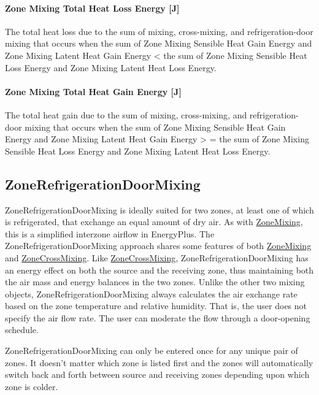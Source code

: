\paragraph{Zone Mixing Total Heat Loss Energy {[}J{]}}\label{zone-mixing-total-heat-loss-energy-j-1}

The total heat loss due to the sum of mixing, cross-mixing, and refrigeration-door mixing that occurs when the sum of Zone Mixing Sensible Heat Gain Energy and Zone Mixing Latent Heat Gain Energy \textless{} the sum of Zone Mixing Sensible Heat Loss Energy and Zone Mixing Latent Heat Loss Energy.

\paragraph{Zone Mixing Total Heat Gain Energy {[}J{]}}\label{zone-mixing-total-heat-gain-energy-j-1}

The total heat gain due to the sum of mixing, cross-mixing, and refrigeration-door mixing that occurs when the sum of Zone Mixing Sensible Heat Gain Energy and Zone Mixing Latent Heat Gain Energy \textgreater{} = the sum of Zone Mixing Sensible Heat Loss Energy and Zone Mixing Latent Heat Loss Energy.

\subsection{ZoneRefrigerationDoorMixing}\label{zonerefrigerationdoormixing}

ZoneRefrigerationDoorMixing is ideally suited for two zones, at least one of which is refrigerated, that exchange an equal amount of dry air. As with \hyperref[zonemixing]{ZoneMixing}, this is a simplified interzone airflow in EnergyPlus. The ZoneRefrigerationDoorMixing approach shares some features of both \hyperref[zonemixing]{ZoneMixing} and \hyperref[zonecrossmixing]{ZoneCrossMixing}. Like \hyperref[zonecrossmixing]{ZoneCrossMixing}, ZoneRefrigerationDoorMixing has an energy effect on both the source and the receiving zone, thus maintaining both the air mass and energy balances in the two zones. Unlike the other two mixing objects, ZoneRefrigerationDoorMixing always calculates the air exchange rate based on the zone temperature and relative humidity. That is, the user does not specify the air flow rate. The user can moderate the flow through a door-opening schedule.

ZoneRefrigerationDoorMixing can only be entered once for any unique pair of zones. It doesn't matter which zone is listed first and the zones will automatically switch back and forth between source and receiving zones depending upon which zone is colder.

